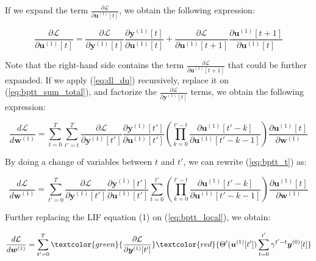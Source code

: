 \documentclass[10pt]{article} %
\begin{document}
    If we expand the term $\frac{\partial \mathcal{L}}{\partial \boldsymbol{u}^{(1)}[t]}$, we obtain the following expression:

    \begin{equation}
        \frac{\partial \mathcal{L}}{\partial \boldsymbol{u}^{(1)}[t]} =   \frac{\partial \mathcal{L}}{\partial \boldsymbol{y}^{(1)}[t]}\frac{\partial \boldsymbol{y}^{(1)}[t]}{\partial \boldsymbol{u}^{(1)}[t]} + \frac{\partial \mathcal{L}}{\partial \boldsymbol{u}^{(1)}[t+1]}\frac{\partial \boldsymbol{u}^{(1)}[t+1]}{\partial \boldsymbol{u}^{(1)}[t]} 
        \label{eq:dl_du}
    \end{equation}

    Note that the right-hand side contains the term $\frac{\partial \mathcal{L}}{\partial \boldsymbol{u}^{(1)}[t+1]}$ that could be further expanded.
    If we apply (\ref{eq:dl_du}) recursively, replace it on (\ref{eq:bptt_sum_total}), and factorize the $\frac{\partial \mathcal{L}}{\partial \boldsymbol{y}^{(1)}[t]}$ terms, we obtain the following expression:
        
    \begin{equation}
    \frac{d \mathcal{L}}{d \boldsymbol{w}^{(1)}} = \sum_{t=0}^T \sum_{t'=t}^T \frac{\partial \mathcal{L}}{\partial \boldsymbol{y}^{(1)}[t']}\frac{\partial \boldsymbol{y}^{(1)}[t']}{\partial \boldsymbol{u}^{(1)}[t']} (\prod_{k=0}^{t'-t} \frac{\partial \boldsymbol{u}^{(1)}[t'-k]}{\partial \boldsymbol{u}^{(1)}[t'-k-1]})  \frac{\partial \boldsymbol{u}^{(1)}[t]}{\partial \boldsymbol{w}^{(1)}}
    \label{eq:bptt_t}
    \end{equation}

    By doing a change of variables between $t$ and $t'$, we can rewrite (\ref{eq:bptt_t}) as:

    \begin{equation}
    \frac{d \mathcal{L}}{d \boldsymbol{w}^{(1)}} = \sum_{t'=0}^T \frac{\partial \mathcal{L}}{\partial \boldsymbol{y}^{(1)}[t']}\frac{\partial \boldsymbol{y}^{(1)}[t']}{\partial \boldsymbol{u}^{(1)}[t']} \sum^{t'}_{t=0}  (\prod_{k=0}^{t'-t} \frac{\partial \boldsymbol{u}^{(1)}[t'-k]}{\partial \boldsymbol{u}^{(1)}[t'-k-1]})  \frac{\partial \boldsymbol{u}^{(1)}[t]}{\partial \boldsymbol{w}^{(1)}}
    \label{eq:bptt_local}
    \end{equation}

    Further replacing the LIF equation (1) on  (\ref{eq:bptt_local}), we obtain:

    \begin{equation}
    \frac{d \mathcal{L}}{d \boldsymbol{w}^{(1)}} = \sum_{t'=0}^T \textcolor{green}{\frac{\partial \mathcal{L}}{\partial \boldsymbol{y}^{(1)}[t']}} \textcolor{red}{\Theta'(\boldsymbol{u}^{(1)}[t']) \sum^{t'}_{t=0}  \gamma^{t'-t} \boldsymbol{y}^{(0)}[t]}
    \label{eq:bptt_expansion}
    \end{equation}
\end{document}
